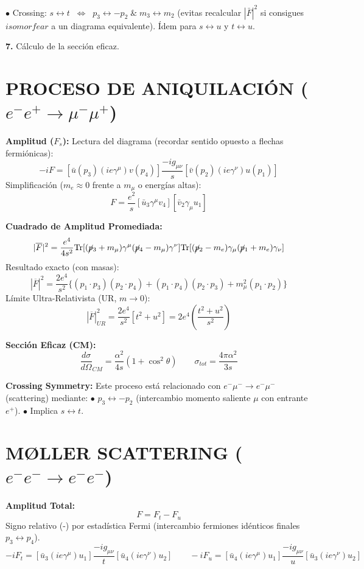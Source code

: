 $\bullet$ Crossing: $s\leftrightarrow t \;\;\Leftrightarrow \;\;p_3 \leftrightarrow -p_2 \; \& \; m_3 \leftrightarrow m_2$ (evitas recalcular $|\bar{F}|^2$ si consigues $\textit{isomorfear}$ a un diagrama equivalente). Ídem para $s\leftrightarrow u$ y $t \leftrightarrow u$.


\textbf{7.} Cálculo de la sección eficaz.





\section{PROCESO DE ANIQUILACIÓN ($e^- e^+ \to \mu^- \mu^+$)}

\textbf{Amplitud ($F_s$):}
Lectura del diagrama (recordar sentido opuesto a flechas fermiónicas):
$$ -iF = [\bar{u}(p_3) (ie\gamma^\mu) v(p_4)] \frac{-ig_{\mu\nu}}{s} [\bar{v}(p_2) (ie\gamma^\nu) u(p_1)] $$
Simplificación ($m_e \approx 0$ frente a $m_\mu$ o energías altas):
$$ F = \frac{e^2}{s} [\bar{u}_3 \gamma^\mu v_4] [\bar{v}_2 \gamma_\mu u_1] $$

\textbf{Cuadrado de Amplitud Promediada:}
$$ |\overline{F}|^2 = \frac{e^4}{4s^2} \text{Tr}[(\cancel{p}_3+m_\mu)\gamma^\mu(\cancel{p}_4-m_\mu)\gamma^\nu] \text{Tr}[(\cancel{p}_2-m_e)\gamma_\mu(\cancel{p}_1+m_e)\gamma_\nu] $$
Resultado exacto (con masas):
$$ |\overline{F}|^2 = \frac{2e^4}{s^2} \{ (p_1 \cdot p_3)(p_2 \cdot p_4) + (p_1 \cdot p_4)(p_2 \cdot p_3) + m_\mu^2(p_1 \cdot p_2) \} $$
Límite Ultra-Relativista (UR, $m \to 0$):
$$ |\overline{F}|^2_{UR} = \frac{2e^4}{s^2} [t^2 + u^2] = 2e^4 \left( \frac{t^2+u^2}{s^2} \right) $$

\textbf{Sección Eficaz (CM):}
$$ \frac{d\sigma}{d\Omega}_{CM} = \frac{\alpha^2}{4s} (1 + \cos^2\theta) \qquad \sigma_{tot} = \frac{4\pi\alpha^2}{3s} $$

\textbf{Crossing Symmetry:}
Este proceso está relacionado con $e^- \mu^- \to e^- \mu^-$ (scattering) mediante:
$\bullet$ $p_3 \leftrightarrow -p_2$ (intercambio momento saliente $\mu$ con entrante $e^+$).
$\bullet$ Implica $s \leftrightarrow t$.

\section{MØLLER SCATTERING ($e^- e^- \to e^- e^-$)}

\textbf{Amplitud Total:}
$$ F = F_t - F_u $$
Signo relativo (-) por estadística Fermi (intercambio fermiones idénticos finales $p_3 \leftrightarrow p_4$).
$$ -iF_t = [\bar{u}_3 (ie\gamma^\mu) u_1] \frac{-ig_{\mu\nu}}{t} [\bar{u}_4 (ie\gamma^\nu) u_2] \qquad -iF_u = [\bar{u}_4 (ie\gamma^\mu) u_1] \frac{-ig_{\mu\nu}}{u} [\bar{u}_3 (ie\gamma^\nu) u_2] $$

